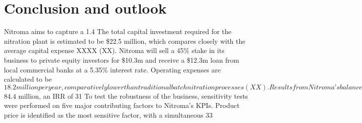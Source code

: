 \section{Conclusion and outlook}
Nitroma aims to capture a 1.4%
The total capital investment required for the nitration plant is estimated to be \$22.5 million, which compares closely with the average capital expense XXXX (XX). Nitroma will sell a 45\% stake in its business to private equity investors for \$10.3m and receive a \$12.3m loan from local commercial banks at a 5.35\% interest rate. Operating expenses are calculated to be $18.2 million per year, comparatively lower than traditional batch nitration processes (XX).  Results from Nitroma’s balance sheet and income statement produced a series of key performance indicators which were used determine the economic feasibility of Nitroma’s business plan. The project is deemed an attractive investment, evidenced by an NPV of $84.4 million, an IRR of 31%
To test the robustness of the business, sensitivity tests were performed on five major contributing factors to Nitroma’s KPIs. Product price is identified as the most sensitive factor, with a simultaneous 33%

